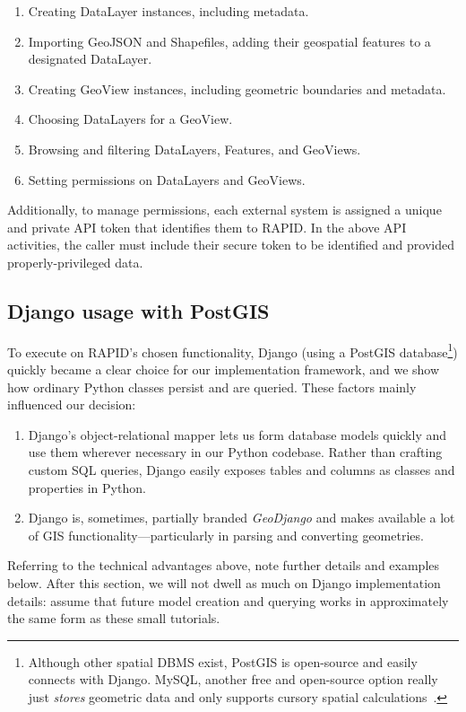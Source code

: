 \begin{enumerate}
  \item Creating DataLayer instances, including metadata.
  \item Importing GeoJSON and Shapefiles, adding their geospatial features to a designated DataLayer.
  \item Creating GeoView instances, including geometric boundaries and metadata.
  \item Choosing DataLayers for a GeoView.
  \item Browsing and filtering DataLayers, Features, and GeoViews.
  \item Setting permissions on DataLayers and GeoViews.
\end{enumerate}

Additionally, to manage permissions, each external system is assigned a unique and private API token that identifies them to RAPID. In the above API activities, the caller must include their secure token to be identified and provided properly-privileged data.

\subsection{Django usage with PostGIS}
\label{sec:prog}
To execute on RAPID's chosen functionality, Django (using a PostGIS database\footnote{Although other spatial DBMS exist, PostGIS is open-source and easily connects with Django. MySQL, another free and open-source option really just \textit{stores} geometric data and only supports cursory spatial calculations~\cite{GeoDb}.}) quickly became a clear choice for our implementation framework, and we show how ordinary Python classes persist and are queried. These factors mainly influenced our decision:

\begin{enumerate}
\item Django's object-relational mapper lets us form database models quickly and use them wherever necessary in our Python codebase. Rather than crafting custom SQL queries, Django easily exposes tables and columns as classes and properties in Python.
\item Django is, sometimes, partially branded \textit{GeoDjango} and makes available a lot of GIS functionality---particularly in parsing and converting geometries.
\end{enumerate}

Referring to the technical advantages above, note further details and examples below. After this section, we will not dwell as much on Django implementation details: assume that future model creation and querying works in approximately the same form as these small tutorials.

